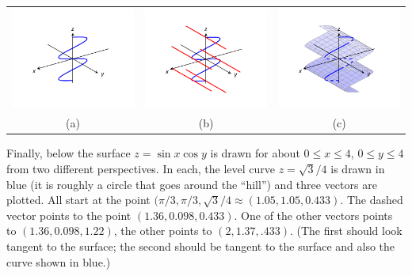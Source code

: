 \documentclass[10pt]{article}
\begin{document}
\begin{tabular}{ccc}
\includegraphics[scale=1.25,trim=5mm 5mm 5mm 5mm,clip=true]{figures/figspace4d} &\includegraphics[scale=1.25,trim=5mm 5mm 5mm 5mm,clip=true]{figures/figspace4e} &\includegraphics[scale=1.25,trim=5mm 5mm 5mm 5mm,clip=true]{figures/figspace4f}\\[-10pt]
(a) & (b) & (c)
\end{tabular}

\clearpage

Finally, below the surface $z = \sin x\cos y $ is drawn for about $0\leq x\leq 4$, $0\leq y\leq 4$ from two different perspectives.  In each, the level curve $z=\sqrt{3}/4$ is drawn in blue (it is roughly a circle that goes around the ``hill'') and three vectors are plotted. All start at the point $(\pi/3,\pi/3,\sqrt{3}/4 \approx (1.05,1.05, 0.433)$. The dashed vector points to the point $(1.36,0.098,0.433)$. One of the other vectors points to $(1.36,0.098, 1.22)$, the other points to $(2,1.37, .433)$. (The first should look tangent to the surface; the second should be tangent to the surface and also the curve shown in blue.)
\end{document}
